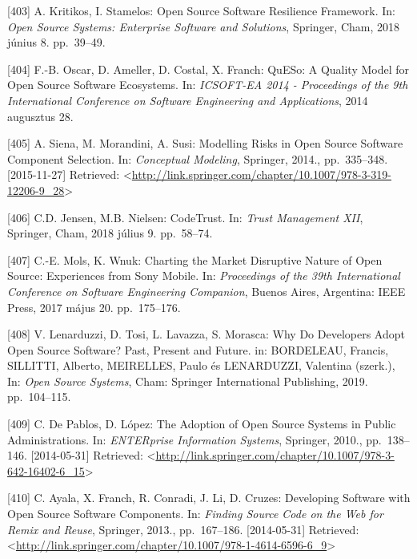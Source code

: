 \documentclass[12pt,magyar,a4paper,oneside]{scrreprt}
\newenvironment{cslreferences}%
  {}%
  {\par}
\begin{document}
\begin{cslreferences}
\leavevmode\hypertarget{ref-kritikos_open_2018}{}%
{[}403{]} A. Kritikos, I. Stamelos: Open Source Software Resilience
Framework. In: \emph{Open Source Systems: Enterprise Software and
Solutions}, Springer, Cham, 2018 június 8. pp.~39--49.

\leavevmode\hypertarget{ref-oscar_queso_2014}{}%
{[}404{]} F.-B. Oscar, D. Ameller, D. Costal, X. Franch: QuESo: A
Quality Model for Open Source Software Ecosystems. In: \emph{ICSOFT-EA
2014 - Proceedings of the 9th International Conference on Software
Engineering and Applications}, 2014 augusztus 28.

\leavevmode\hypertarget{ref-siena_modelling_2014}{}%
{[}405{]} A. Siena, M. Morandini, A. Susi: Modelling Risks in Open
Source Software Component Selection. In: \emph{Conceptual Modeling},
Springer, 2014., pp.~335--348. {[}2015-11-27{]} Retrieved:
\textless{}\url{http://link.springer.com/chapter/10.1007/978-3-319-12206-9_28}\textgreater{}

\leavevmode\hypertarget{ref-jensen_codetrust_2018}{}%
{[}406{]} C.D. Jensen, M.B. Nielsen: CodeTrust. In: \emph{Trust
Management XII}, Springer, Cham, 2018 július 9. pp.~58--74.

\leavevmode\hypertarget{ref-mols_charting_2017}{}%
{[}407{]} C.-E. Mols, K. Wnuk: Charting the Market Disruptive Nature of
Open Source: Experiences from Sony Mobile. In: \emph{Proceedings of the
39th International Conference on Software Engineering Companion}, Buenos
Aires, Argentina: IEEE Press, 2017 május 20. pp.~175--176.

\leavevmode\hypertarget{ref-lenarduzzi_why_2019}{}%
{[}408{]} V. Lenarduzzi, D. Tosi, L. Lavazza, S. Morasca: Why Do
Developers Adopt Open Source Software? Past, Present and Future. in:
BORDELEAU, Francis, SILLITTI, Alberto, MEIRELLES, Paulo és LENARDUZZI,
Valentina (szerk.), In: \emph{Open Source Systems}, Cham: Springer
International Publishing, 2019. pp.~104--115.

\leavevmode\hypertarget{ref-de_pablos_adoption_2010}{}%
{[}409{]} C. De Pablos, D. López: The Adoption of Open Source Systems in
Public Administrations. In: \emph{ENTERprise Information Systems},
Springer, 2010., pp.~138--146. {[}2014-05-31{]} Retrieved:
\textless{}\url{http://link.springer.com/chapter/10.1007/978-3-642-16402-6_15}\textgreater{}

\leavevmode\hypertarget{ref-ayala_developing_2013}{}%
{[}410{]} C. Ayala, X. Franch, R. Conradi, J. Li, D. Cruzes: Developing
Software with Open Source Software Components. In: \emph{Finding Source
Code on the Web for Remix and Reuse}, Springer, 2013., pp.~167--186.
{[}2014-05-31{]} Retrieved:
\textless{}\url{http://link.springer.com/chapter/10.1007/978-1-4614-6596-6_9}\textgreater{}


\end{cslreferences}
\end{document}
